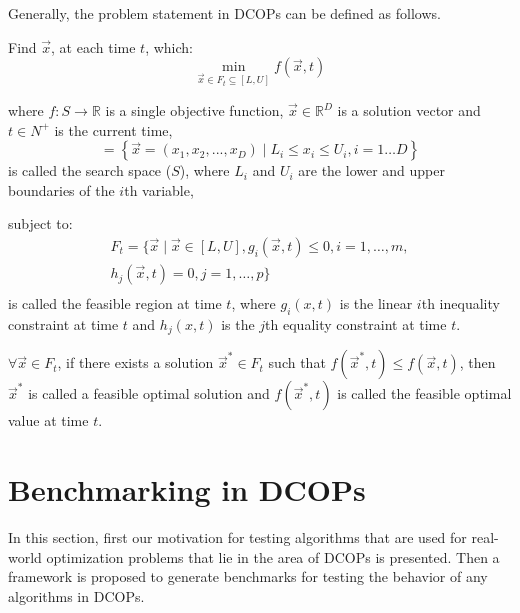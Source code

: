\documentclass[review]{elsarticle}
\begin{document}
Generally, the problem statement in DCOPs can be defined as follows. 

Find $\vec{x}$, at each time $t$, which: 
\begin{equation}
		\min_{\vec{x}\in F_t\subseteq[L, U]} f(\vec{x}, t)
\end{equation}

where $f:S \rightarrow \mathbb{R}$ is a single objective function, $\vec{x} \in \mathbb{R}^D $ is a solution vector and $t \in N^+$ is the current time, 
\begin{equation}
[L, U]=  \left\lbrace \vec{x} = (x_{1},x_{2},...,x_{D}) \mid L_i \leq x_i \leq U_i, i = 1 \ldots D\right\rbrace
\end{equation}
is called the search space ($S$), where $L_i$ and $U_i$ are the lower and upper boundaries of the $i$th variable,

subject to:
\begin{equation}
\begin{array}{l}
F_{t}=\{ \vec{x} \mid \vec{x} \in [L,U], g_i (\vec{x},t) \le 0, i = 1, \ldots, m,\\
h_j (\vec{x},t) = 0,j = 1, \ldots, p\} \\
\end{array}
\end{equation}
is called the feasible region at time $t$, where $g_i(x, t)$ is the linear $i$th inequality constraint at time $t$ and $h_j(x,t)$ is the $j$th equality constraint at time $t$.

$\forall \vec{x} \in F_t$, if there exists a solution $\vec{x}^* \in F_t$ such that 
$f(\vec{x}^*,t)\leq f(\vec{x},t)$,  then $\vec{x}^*$ is called a feasible optimal solution 
and $f(\vec{x}^*,t)$ is called the feasible optimal value at time $t$. 


\section{Benchmarking in DCOPs}
\label{sec:change-setup}
In this section, first our motivation for testing algorithms that are used for real-world optimization problems that lie in the area of DCOPs is presented. Then a framework is proposed to generate benchmarks for testing the behavior of any algorithms in DCOPs.
\end{document}
